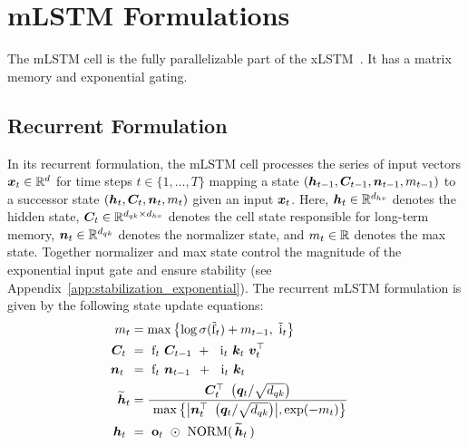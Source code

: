 \documentclass{article}
\newcommand{\cellstate}[1]{{#1}}
\newcommand{\expGate}[1]{{#1}}
\newcommand{\gates}[1]{{#1}}
\begin{document}
\vspace{-0.2cm}
\section{mLSTM Formulations}
\label{sec:mlstm_formulations}
\vspace{-0.1cm}
The mLSTM cell is the fully parallelizable part of the xLSTM~\citep{beck:24xlstm}.
It has a matrix memory and exponential gating.
\vspace{-0.2cm}
\subsection{Recurrent Formulation}
\label{sec:recurrent_formulation}
\vspace{-0.1cm}
In its recurrent formulation, the mLSTM cell processes the series of input vectors $\bm{x}_t \in \mathbb{R}^{d}$ for time steps $t \in \{1, \dots, T \}$ mapping a state $\left(\bm{h}_{t-1}, \bm{C}_{t-1}, \bm{n}_{t-1}, m_{t-1}\right)$ to a successor state $\left(\bm{h}_{t}, \bm{C}_{t}, \bm{n}_{t}, m_{t}\right)$ given an input $\bm{x}_t$.
Here, $\bm{h}_{t} \in \mathbb{R}^{d_{hv}}$ denotes the hidden state, $\bm{C}_{t} \in \mathbb{R}^{d_{qk} \times d_{hv}}$ denotes the cell state responsible for long-term memory, $\bm{n}_{t} \in \mathbb{R}^{d_{qk}}$ denotes the normalizer state, and $m_{t} \in \mathbb{R}$ denotes the max state.
Together normalizer and max state control the magnitude of the exponential input gate and ensure stability (see Appendix~\ref{app:stabilization_exponential}).
The recurrent mLSTM formulation is given by the following state update equations:
\begin{align}
    \cellstate{m_t}                          & = \max\left\{ \gates{\log \sigma(\tilde{\Rf}_t)} + \cellstate{m_{t-1}}, \ \tilde{\Ri}_t \right\}                                                                                     & \\
    \cellstate{\BC_t} \                      & = \  \gates{\Rf_t} \ \cellstate{\BC_{t-1}} \ + \
    \expGate{\ \Ri_t} \ {\Bk_t \ \Bv_t^\top} &                                                                                                                                                                                        \\
    \cellstate{\Bn_t \ \!} \                 & = \  \gates{\Rf_t} \ \cellstate{\Bn_{t-1} \ \! } \ + \
    \expGate{\ \Ri_t} \ {\Bk_t}                                                                                                                                                                                                       \\
    \widetilde{\Bh}_t                        & = \frac{\cellstate{\BC_t^\top} \ \left({\Bq_t} / \sqrt{d_{qk}} \right)} { \ \max \left\{ \ABS{\cellstate{\Bn_t^\top} \ \left({\Bq_t} / \sqrt{d_{qk}} \right) }, \exp(-m_t) \right\}}   \\
    \Bh_t  \                                 & = \ \gates{\bfo_t} \ \odot  \ \mathrm{NORM} ( \, \widetilde{\Bh}_t \, )   \label{eq:mlstm_rec_hidden_state_output}
\end{align}
\end{document}

